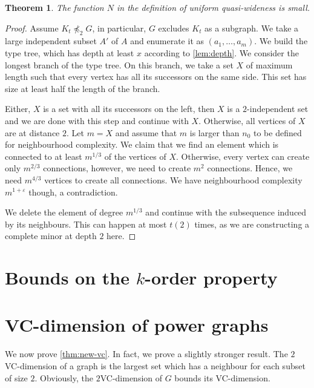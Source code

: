 \documentclass[11pt, fleqn]{article}
\theoremstyle{plain}
\newtheorem{theorem}{Theorem}
\theoremstyle{nonumberplain}
\newtheorem{proof}{Proof.}
\renewcommand{\epsilon}{\varepsilon}
\newcommand{\minor}{\preccurlyeq}
\begin{document}
\begin{theorem}
The function $N$ in the definition of uniform quasi-wideness
is small.
\end{theorem}
\begin{proof}
Assume $K_t\not\minor_2G$, in particular, $G$ excludes $K_t$
as a subgraph. We take a large independent subset $A'$ of $A$ and
enumerate it as $(a_1,\ldots, a_m)$. We build the type
tree, which has depth at least $x$ according to \cref{lem:depth}. 
We consider the longest branch of the type tree. On this branch, 
we take a set $X$ of maximum length such that every vertex has 
all its successors on the same side. This set has size at least
half the length of the branch. 

Either, $X$ is a set with all its successors on the left, then $X$ 
is a $2$-independent set and we are done with this step and
continue with $X$. Otherwise, all vertices of $X$ are at distance
$2$. Let $m=X$ and assume that $m$ is larger than $n_0$ to
be defined for neighbourhood complexity.
We claim that we find an element which is connected to at least $m^{1/3}$
of the vertices of $X$. Otherwise, every vertex
can create only $m^{2/3}$ connections, however, we need
to create $m^2$ connections. Hence, we need $m^{4/3}$ vertices
to create all connections. We have neighbourhood complexity
$m^{1+\epsilon}$ though, a contradiction. 

We delete the element of degree $m^{1/3}$ 
and continue with the subsequence
induced by its neighbours. This can happen at most 
$t(2)$ times, as we are constructing a complete minor at 
depth $2$ here. 
\end{proof}



\section{Bounds on the $k$-order property}\label{sec:stable}

\section{VC-dimension of power graphs}\label{sec:vc}

We now prove \cref{thm:new-vc}. 
In fact, we prove a slightly stronger result. The $2$VC-dimension
of a graph is the largest set which has a neighbour for each 
subset of size $2$. Obviously, the $2$VC-dimension of $G$
bounds its VC-dimension. 
\end{document}
